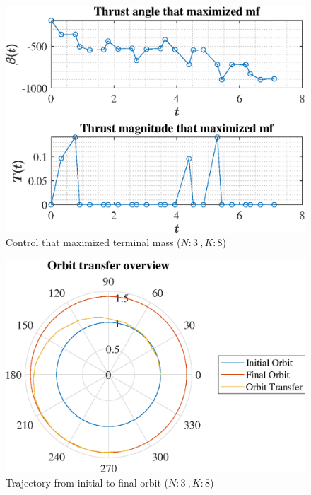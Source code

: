 \documentclass[]{article}
\begin{document}
	\begin{figure}
		\centering
		\includegraphics[scale=0.75]{control_N3_K8_C2_mf.eps}
		\caption{Control that maximized terminal mass (\(N:3\ , K:8\))}
		\label{fig:control_N3_K8_C2_mf}
	\end{figure}
	\begin{figure}
		\centering
		\includegraphics[scale=0.75]{orbit_N3_K8_C2_mf.eps}
		\caption{Trajectory from initial to final orbit (\(N:3\ , K:8\))}
		\label{fig:orbit_N3_K8_C2_mf}
	\end{figure}
\end{document}
